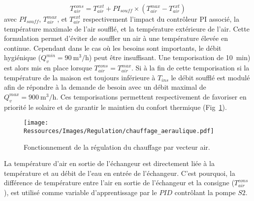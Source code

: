 \begin{equation}\label{eq:temp_soufflage}
    T_{air}^{cons} = T_{air}^{ext} + PI_{souff} \times (T_{air}^{max} - T_{air}^{ext})
\end{equation}
avec $PI_{souff}$, $T_{air}^{max}$, et $T_{air}^{ext}$ respectivement l’impact du
contrôleur PI associé, la température maximale de l’air soufflé, et la température
extérieure de l’air. Cette formulation permet d’éviter de souffler un air à une
température élevée en continue. Cependant dans le cas où les besoins sont importants, le
débit hygiénique ($Q_{v}^{min} = \SI[per-mode=symbol]{90}{\meter\cubed\per\hour}$) peut être insuffisant. Une
temporisation de \SI{10}{min}) est alors mis en place lorsque $T_{air}^{cons} =
T_{air}^{max}$. Si à la fin de cette temporisation si la température de la maison est
toujours inférieure à $T_{ins}$ le débit soufflé est modulé afin de répondre à la demande
de besoin avec un débit maximal de $Q_{v}^{max} = \SI[per-mode=symbol]{900}{\meter\cubed\per\hour}$. Ces
temporisations permettent respectivement de favoriser en priorité le solaire et de
garantir le maintien du confort thermique (Fig~\ref{fig:chauffage_aeraulique}).

\begin{figure}
    \begin{center}
        \texttt{[image: Ressources/Images/Regulation/chauffage\_aeraulique.pdf]}
    \end{center}
    \caption{Fonctionnement de la régulation du chauffage par vecteur air.
             \label{fig:chauffage_aeraulique}}
\end{figure}

La température d’air en sortie de l’échangeur est directement liée à la température et au
débit de l’eau en entrée de l’échangeur. C’est pourquoi, la différence de température
entre l’air en sortie de l’échangeur et la consigne ($T_{air}^{cons}$), est utilisé comme
variable d’apprentissage par le $PID$ contrôlant la pompe $S2$.

